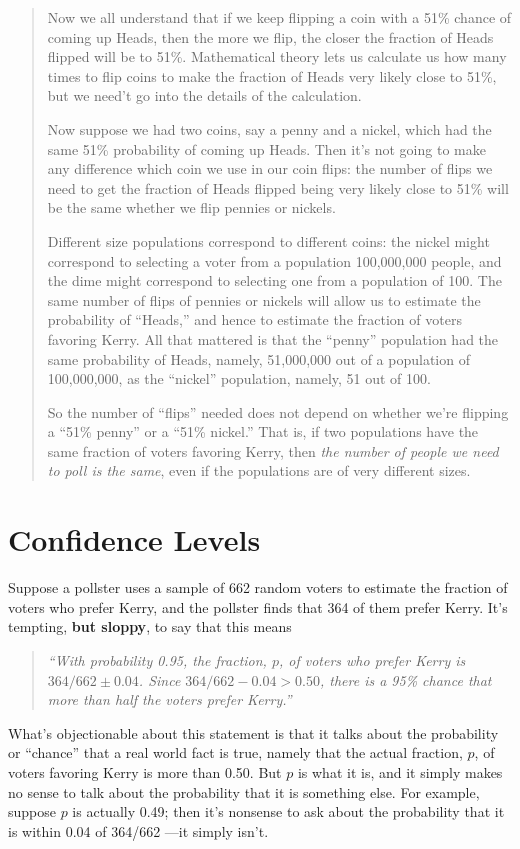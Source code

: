 \documentclass[11pt,twoside]{article}
\begin{document}
\begin{notesproblem}
{\begin{quote}
Now we all understand that if we keep flipping a coin with a 51\% chance
of coming up Heads, then the more we flip, the closer the fraction of
Heads flipped will be to 51\%.  Mathematical theory lets us calculate us
how many times to flip coins to make the fraction of Heads very likely
close to 51\%, but we need't go into the details of the calculation.

Now suppose we had two coins, say a penny and a nickel, which had the same
51\% probability of coming up Heads.  Then it's not going to make any
difference which coin we use in our coin flips: the number of flips we
need to get the fraction of Heads flipped being very likely close to 51\%
will be the same whether we flip pennies or nickels.

Different size populations correspond to different coins: the nickel might
correspond to selecting a voter from a population 100,000,000 people, and
the dime might correspond to selecting one from a population of 100.  The
same number of flips of pennies or nickels will allow us to estimate the
probability of ``Heads,'' and hence to estimate the fraction of voters
favoring Kerry.  All that mattered is that the ``penny'' population had the
same probability of Heads, namely, 51,000,000 out of a population of
100,000,000, as the ``nickel'' population, namely, 51 out of 100.

So the number of ``flips'' needed does not depend on whether we're
flipping a ``51\% penny'' or a ``51\% nickel.''  That is, if two
populations have the same fraction of voters favoring Kerry, then \emph{the
number of people we need to poll is the same}, even if the populations are
of very different sizes.
\end{quote}
}

\end{notesproblem}


\section{Confidence Levels}

Suppose a pollster uses a sample of 662 random voters to estimate the
fraction of voters who prefer Kerry, and the pollster finds that 364 of them
prefer Kerry.  It's tempting, \textbf{but sloppy}, to say that this means
\begin{quote}
\emph{``With probability 0.95, the fraction, $p$, of voters who prefer
Kerry is $364/662 \pm 0.04$.  Since $364/662 -0.04 >0.50$, there is a 95\%
chance that more than half the voters prefer Kerry.''}
\end{quote}
What's objectionable about this statement is that it talks about the
probability or ``chance'' that a real world fact is true, namely that the
actual fraction, $p$, of voters favoring Kerry is more than 0.50.  But $p$
is what it is, and it simply makes no sense to talk about the probability
that it is something else.  For example, suppose $p$ is actually 0.49;
then it's nonsense to ask about the probability that it is within 0.04 of
364/662 ---it simply isn't.
\end{document}
